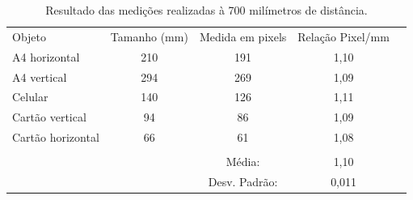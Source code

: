 \documentclass[12pt]{article}
\begin{document}
	
	
	\begin{table}[h!]
		\begin{tabular}{lcccl}
			\cline{1-4}
			\multicolumn{1}{|l|}{Objeto}            & \multicolumn{1}{c|}{Tamanho (mm)} & \multicolumn{1}{c|}{Medida em pixels} & \multicolumn{1}{c|}{Relação Pixel/mm} &  \\ \cline{1-4}
			\multicolumn{1}{|l|}{A4 horizontal}     & \multicolumn{1}{c|}{210}          & \multicolumn{1}{c|}{191}              & \multicolumn{1}{c|}{1,10}             &  \\ \cline{1-4}
			\multicolumn{1}{|l|}{A4 vertical}       & \multicolumn{1}{c|}{294}          & \multicolumn{1}{c|}{269}              & \multicolumn{1}{c|}{1,09}             &  \\ \cline{1-4}
			\multicolumn{1}{|l|}{Celular}           & \multicolumn{1}{c|}{140}          & \multicolumn{1}{c|}{126}              & \multicolumn{1}{c|}{1,11}             &  \\ \cline{1-4}
			\multicolumn{1}{|l|}{Cartão vertical}   & \multicolumn{1}{c|}{94}           & \multicolumn{1}{c|}{86}               & \multicolumn{1}{c|}{1,09}             &  \\ \cline{1-4}
			\multicolumn{1}{|l|}{Cartão horizontal} & \multicolumn{1}{c|}{66}           & \multicolumn{1}{c|}{61}               & \multicolumn{1}{c|}{1,08}             &  \\ \cline{1-4}
			\multicolumn{1}{c}{}                    &                                   &                                       &                                       &  \\ \cline{3-4}
			\multicolumn{1}{c}{}                    & \multicolumn{1}{c|}{}             & \multicolumn{1}{c|}{Média:}           & \multicolumn{1}{c|}{1,10}             &  \\ \cline{3-4}
			\multicolumn{1}{c}{}                    & \multicolumn{1}{c|}{}             & \multicolumn{1}{c|}{Desv. Padrão:}    & \multicolumn{1}{c|}{0,011}            &  \\ \cline{3-4}
		\end{tabular}
		\caption{Resultado das medições realizadas à 700 milímetros de distância.}
		\label{t2}
	\end{table}
	
\end{document}
